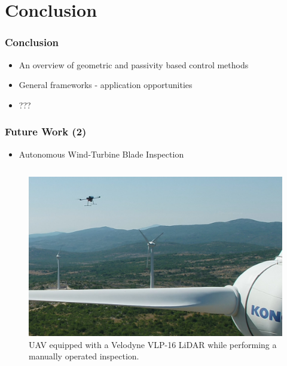 \section{Conclusion}

\begin{frame}
	\frametitle{Conclusion}
	
	\begin{itemize}
		\item An overview of geometric and passivity based control methods
		\item General frameworks - application opportunities
		\item ???
	\end{itemize}
\end{frame}

\begin{frame}
	\frametitle{Future Work (2)}
	\begin{itemize}
		\item Autonomous Wind-Turbine Blade Inspection
	\end{itemize}
	
	\begin{columns}
	
		\begin{column}{0.5\textwidth}\centering
			\begin{figure}[H]
				\centering
				\includegraphics[width=\columnwidth]{figures/drone_flight3_1.png}
				\caption{UAV equipped with a Velodyne VLP-16 LiDAR while performing a manually operated inspection.}
			\end{figure}
		\end{column}
	

\end{columns}
\end{frame}
